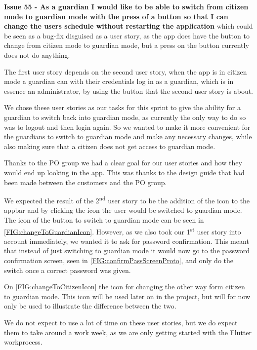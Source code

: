 \textbf{Issue 55 - As a guardian I would like to be able to switch from citizen mode to guardian mode with the press of a button so that I can change the users schedule without restarting the application} which could be seen as a bug-fix disguised as a user story, as the app does have the button to change from citizen mode to guardian mode, but a press on the button currently does not do anything.

The first user story depends on the second user story, when the app is in citizen mode a guardian can with their credentials log in as a guardian, which is in essence an administrator, by using the button that the second user story is about.

We chose these user stories as our tasks for this sprint to give the ability for a guardian to switch back into guardian mode, as currently the only way to do so was to logout and then login again.
So we wanted to make it more convenient for the guardians to switch to guardian mode and make any necessary changes, while also making sure that a citizen does not get access to guardian mode.

Thanks to the PO group we had a clear goal for our user stories and how they would end up looking in the app.
This was thanks to the design guide that had been made between the customers and the PO group.

We expected the result of the 2\textsuperscript{nd} user story to be the addition of the icon to the appbar and by clicking the icon the user would be switched to guardian mode.
The icon of the button to switch to guardian mode can be seen in \autoref{FIG:changeToGuardianIcon}.
However, as we also took our 1\textsuperscript{st} user story into account immediately, we wanted it to ask for password confirmation.
This meant that instead of just switching to guardian mode it would now go to the password confirmation screen, seen in \autoref{FIG:confirmPassScreenProto}, and only do the switch once a correct password was given.


On \autoref{FIG:changeToCitizenIcon} the icon for changing the other way form citizen to guardian mode. 
This icon will be used later on in the project, but will for now only be used to illustrate the difference between the two. 

We do not expect to use a lot of time on these user stories, but we do expect them to take around a work week, as we are only getting started with the Flutter workprocess.
